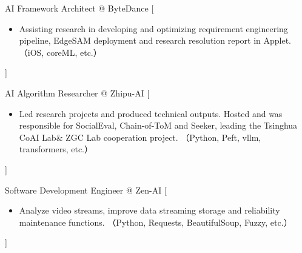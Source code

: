 \documentclass[zh]{resume}
\begin{document}
\begin{experiences}
    {AI Framework Architect @ ByteDance}%
    [\begin{itemize}
      \item Assisting research in developing and optimizing requirement engineering pipeline, EdgeSAM deployment and research resolution report in Applet.（iOS, coreML, etc.）
    \end{itemize}]

  \separator{0.5ex}
    {AI Algorithm Researcher @ Zhipu-AI}%
    [\begin{itemize}
      \item Led research projects and produced technical outputs. Hosted and was responsible for SocialEval, Chain-of-ToM and Seeker, leading the Tsinghua CoAI Lab\& ZGC Lab cooperation project.
        （Python, Peft, vllm, transformers, etc.）
    \end{itemize}]

  \separator{0.5ex}
  
    {Software Development Engineer @ Zen-AI}%
    [\begin{itemize}
      \item Analyze video streams, improve data streaming storage and reliability maintenance functions.
        （Python, Requests, BeautifulSoup, Fuzzy, etc.）
    \end{itemize}]

  \separator{0.5ex}

\end{experiences}
\end{document}
